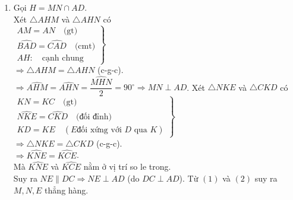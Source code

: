 \begin{vd}
{\begin{enumerate}
{
}
$\Rightarrow \widehat{AND}=\widehat{AMD}=90^\circ \Rightarrow DN\perp AC$.
\item Gọi $H=MN\cap AD$.\\
Xét $\triangle AHM$ và $\triangle AHN$ có\\
$\left. 
\begin{array}{l}
AM=AN \quad \text{(gt)}\\ 
\widehat{BAD}=\widehat{CAD} \quad \text{(cmt)}\\
AH: \quad \text{cạnh chung}
\end{array} 
\right\}$\\
$\Rightarrow \triangle AHM=\triangle AHN$ (c-g-c).\\
$\Rightarrow \widehat{AHM}=\widehat{AHN}= \dfrac{\widehat{MHN}}{2}=90^\circ\Rightarrow MN\perp AD$. 
Xét $\triangle NKE$ và $\triangle CKD$ có\\
$\left. 
\begin{array}{l}
KN=KC \quad \text{(gt)}\\ 
\widehat{NKE}=\widehat{CKD} \quad \text{(đối đỉnh)}\\
KD=KE \quad (E \text{đối xứng với } D \text{ qua } K)
\end{array} 
\right\}$\\
$\Rightarrow \triangle NKE=\triangle CKD$ (c-g-c).\\
$\Rightarrow \widehat{KNE}=\widehat{KCE}$.\\
Mà $\widehat{KNE}$ và $\widehat{KCE}$ nằm ở vị trí so le trong.\\
Suy ra $NE\parallel DC\Rightarrow NE \perp AD$ (do $DC\perp AD$). 
Từ $(1)$ và $(2)$ suy ra $M, N, E$ thẳng hàng.
\end{enumerate}
}
\end{vd}

